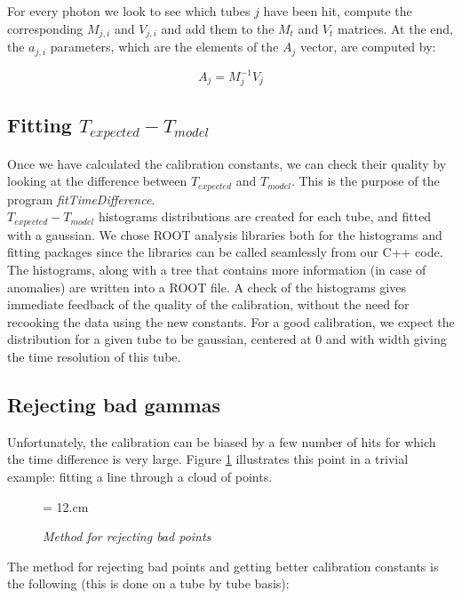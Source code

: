 \documentclass [12pt,letterpaper]{article}
\begin{document}
For every photon we look to see which tubes $j$ have been hit, compute the  corresponding $M_{j, i}$ and $V_{j, i}$ and add them to the $M_{t}$ and $V_{t}$ matrices. At the end, the $a_{j, i}$ parameters, which are the elements of the $A_{j}$ vector, are computed by:

\begin{equation}
A_{j} = M_{j}^{-1} V_{j}
\end{equation}


\subsection{Fitting $T_{expected} - T_{model}$}
Once we have calculated the calibration constants, we can check their quality by looking at the difference between $T_{expected}$ and $T_{model}$. This is the purpose of the program {\it fitTimeDifference}.\\
$T_{expected} - T_{model}$ histograms distributions are created for each tube, and fitted with a gaussian. We chose ROOT analysis libraries both for the histograms and fitting packages since the libraries can be called seamlessly from our C++ code. The histograms, along with a tree that contains more information (in case of anomalies) are written into a ROOT file. A check of the histograms gives immediate feedback of the quality of the calibration, without the need for recooking the data using the new constants. For a good calibration, we expect the distribution for a given tube to be gaussian, centered at 0 and with width giving the time resolution of this tube. 

\subsection{Rejecting bad gammas}
Unfortunately, the calibration can be biased by a few number of hits for which the time difference is very large. Figure \ref{fig:biaised_calib} illustrates this point in a trivial example: fitting a line through a cloud of points.

\begin{figure} [h]
\begin{center}
\epsfxsize = 12.cm
\caption {\it Method for rejecting bad points}
\label{fig:biaised_calib}
\end{center}
\end{figure}

The method for rejecting bad points and getting better calibration constants is the following (this is done on a tube by tube basis):
\end{document}
